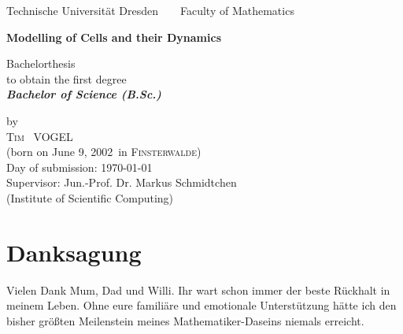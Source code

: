 \documentclass[a4paper,12pt,leqno]{article}
\theoremstyle{plain}
\theoremstyle{remark}
\newcommand{\name}{Vogel}
\newcommand{\vorname}{Tim}
\newcommand{\gebdatum}{June 9, 2002}
\newcommand{\ort}{Finsterwalde}
\newcommand{\betreuer}{Jun.-Prof. Dr. Markus Schmidtchen}
\newcommand{\institut}{Institute of Scientific Computing}
\newcommand{\thema}{Modelling of Cells and their Dynamics}
\newcommand{\datum}{\today} %
\begin{document}

\thispagestyle{empty}

\begin{center}
{\Large Technische Universität Dresden\  \ \textbullet\ \ Faculty of Mathematics}

\vfil

{\bfseries\Huge\thema}

\vfil
{\LARGE
Bachelorthesis \\[\bigskipamount]
to obtain the first degree\\[\bigskipamount]
\bfseries{\itshape Bachelor of Science  \textup{(}B.Sc.\textup{)}}\\[\bigskipamount]
}

\vfil\vfil

\vfil

by
\\[\bigskipamount]
\textsc{\vorname\ } \MakeUppercase{\name}
\\[\bigskipamount]
(born on \gebdatum\ in \textsc{\ort})
\\[\bigskipamount]
Day of submission: \datum
\\[\bigskipamount]
Supervisor: \betreuer\ \\ (\institut)
\end{center}

\cleardoublepage

\setlength{\parskip}{.4em} 

\newpage
\section*{Danksagung}
Vielen Dank Mum, Dad und Willi. Ihr wart schon immer der beste Rückhalt in meinem Leben. Ohne eure familiäre und emotionale Unterstützung hätte ich den bisher größten Meilenstein meines Mathematiker-Daseins niemals erreicht.
\newpage
\tableofcontents


\newpage 
\listoffigures 




\newpage
\end{document}
